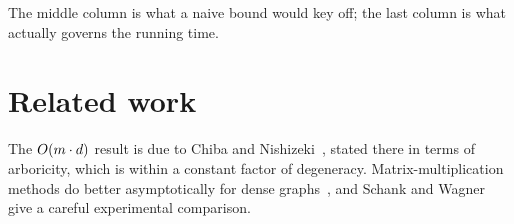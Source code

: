 \documentclass[11pt]{article}
\begin{document}
The middle column is what a naive bound would key off; the last column is what
actually governs the running time.

\section{Related work}

The $O(m \cdot d)$ result is due to Chiba and
Nishizeki~\cite{chiba1985arboricity}, stated there in terms of arboricity,
which is within a constant factor of degeneracy. Matrix-multiplication methods
do better asymptotically for dense graphs~\cite{alon1997finding}, and
Schank and Wagner~\cite{schank2005finding} give a careful experimental
comparison.



\end{document}
